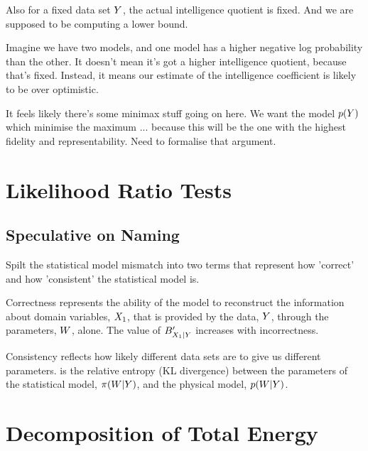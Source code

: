 \documentclass[]{article}
\begin{document}
Also for a fixed data set $Y$, the actual intelligence quotient is fixed. And we are supposed to be computing a lower bound. 

Imagine we have two models, and one model has a higher negative log probability than the other. It doesn't mean it's got a higher intelligence quotient, because that's fixed. Instead, it means our estimate of the intelligence coefficient is likely to be over optimistic. 

It feels likely there's some minimax stuff going on here. We want the model $p(Y)$ which minimise the maximum ... because this will be the one with the highest fidelity and representability. Need to formalise that argument.

\section{Likelihood Ratio Tests}


\subsection{Speculative on Naming}

Spilt the statistical model mismatch into two terms that represent how
'correct' and how 'consistent' the statistical model is.

Correctness represents the ability of the model to reconstruct the
information about domain variables, \({X_1}\), that is
provided by the data, \(Y\), through the parameters,
\(W\), alone. The value of
\(B^\prime_{{X_1}|Y}\) increases with
incorrectness.

Consistency reflects how likely different data sets are to give us
different parameters. is the relative entropy (KL divergence) between
the parameters of the statistical model,
\(\pi(W|Y)\), and the physical model,
\(p(W|Y)\).



\appendix

\section{Decomposition of Total Energy} \label{sec-decomposition-of-total-energy}
\end{document}
